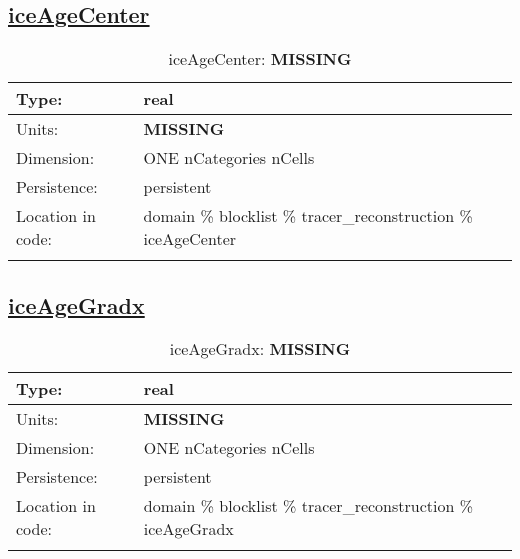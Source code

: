 \subsection[iceAgeCenter]{\hyperref[sec:var_tab_tracer_reconstruction]{iceAgeCenter}}
\label{subsec:var_sec_tracer_reconstruction_iceAgeCenter}
\begin{center}
\begin{longtable}{| p{2.0in} | p{4.0in} |}
        \hline 
        Type: & real \\
        \hline 
        Units: & {\bf \color{red} MISSING} \\
        \hline 
        Dimension: & ONE nCategories nCells \\
        \hline 
        Persistence: & persistent \\
        \hline 
         Location in code: & domain \% blocklist \% tracer\_reconstruction \% iceAgeCenter \\
         \hline 
    \caption{iceAgeCenter: {\bf \color{red} MISSING}}
\end{longtable}
\end{center}
\subsection[iceAgeGradx]{\hyperref[sec:var_tab_tracer_reconstruction]{iceAgeGradx}}
\label{subsec:var_sec_tracer_reconstruction_iceAgeGradx}
\begin{center}
\begin{longtable}{| p{2.0in} | p{4.0in} |}
        \hline 
        Type: & real \\
        \hline 
        Units: & {\bf \color{red} MISSING} \\
        \hline 
        Dimension: & ONE nCategories nCells \\
        \hline 
        Persistence: & persistent \\
        \hline 
         Location in code: & domain \% blocklist \% tracer\_reconstruction \% iceAgeGradx \\
         \hline 
    \caption{iceAgeGradx: {\bf \color{red} MISSING}}
\end{longtable}
\end{center}
